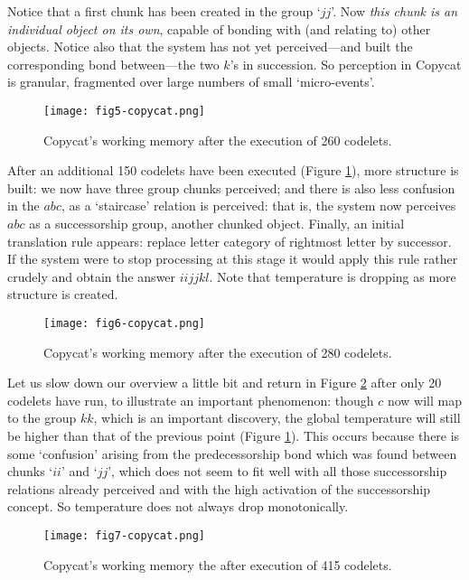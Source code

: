 Notice that a first chunk has been created in the group `$jj$'.  Now \emph{this chunk is an individual object on its own}, capable of bonding with (and relating to) other objects. Notice also that the system has not yet perceived---and built the corresponding bond between---the two $k$'s in succession. So perception in Copycat is granular, fragmented over large numbers of small `micro-events'.

\begin{figure}
\centering
\texttt{[image: fig5-copycat.png]}
\caption{\label{fig:run-2}Copycat’s working memory after the execution of 260 codelets.}
\end{figure}


After an additional 150 codelets have been executed (Figure \ref{fig:run-2}), more structure is built:  we now have three group chunks perceived; and there is also less confusion in the $abc$, as a `staircase' relation is perceived: that is, the system now perceives $abc$ as a successorship group, another chunked object. Finally, an initial translation rule appears: replace letter category of rightmost letter by successor. If the system were to stop processing at this stage it would apply this rule rather crudely and obtain the answer $iijjkl$.  Note that temperature is dropping as more structure is created.

\begin{figure}
\centering
\texttt{[image: fig6-copycat.png]}
\caption{\label{fig:run-3}Copycat’s working memory after the execution of 280 codelets. }
\end{figure}


Let us slow down our overview a little bit and return in Figure \ref{fig:run-3} after only 20 codelets have run, to illustrate an important phenomenon: though $c$ now will map to the group $kk$, which is an important discovery, the global temperature will still be higher than that of the previous point (Figure \ref{fig:run-2}).  This occurs because there is some `confusion' arising from the predecessorship bond which was found between chunks `$ii$' and `$jj$', which does not seem to fit well with all those successorship relations already perceived and with the high activation of the successorship concept.  So temperature does not always drop monotonically.


\begin{figure}
\centering
\texttt{[image: fig7-copycat.png]}
\caption{\label{fig:frog}Copycat's working memory the after execution of 415 codelets.}
\end{figure}

